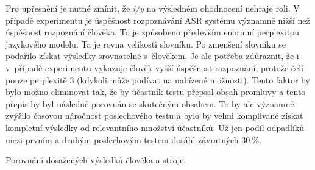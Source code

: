 Pro upřesnění je nutné zmínit, že \textit{i/y} na výsledném ohodnocení nehraje roli.
V případě experimentu  je úspěšnost rozpoznávání ASR systému významně nižší než úspěšnost rozpoznání člověka.
To je způsobeno především enormní perplexitou jazykového modelu.
Ta je rovna velikosti slovníku.
Po zmenšení slovníku se podařilo získat výsledky srovnatelné s~člověkem.
Je ale potřeba zdůraznit, že i v~případě  experimentu vykazuje člověk vyšší úspěšnost rozpoznání, protože čelí pouze perplexitě $3$ (kdykoli může podívat na nabízené možnosti).
Tento faktor by bylo možno eliminovat tak, že by účastník testu přepsal obsah promluvy a tento přepis by byl následně porovnán se skutečným obsahem.
To by ale významně zvýšilo časovou náročnost poslechového testu a bylo by velmi komplivané získat kompletní výsledky od relevantního množství účastníků.
Už jen podíl odpadlíků mezi prvním a druhým poslechovým testem dosáhl závratných $30~\%$.


\begin{table}[htpb]
  \centering
  \def\arraystretch{1.5}
  \caption{Porovnání dosažených výsledků člověka a stroje.}
  \label{tab:realisation:comparison}
\end{table}

